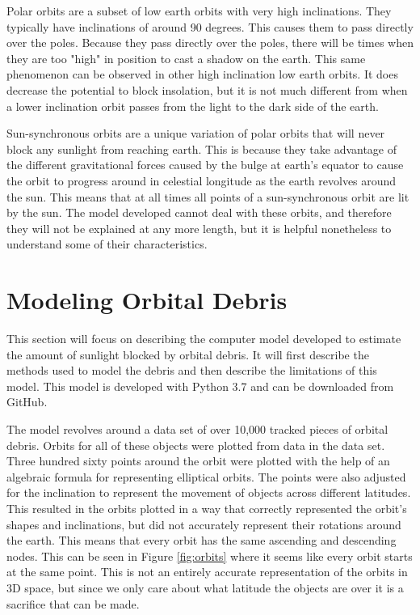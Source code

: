 \documentclass[11pt]{article}
\begin{document}
\begin{multicols*}{2}
Polar orbits are a subset of low earth orbits with very high inclinations. They typically have inclinations of around 90 degrees. This causes them to pass directly over the poles. Because they pass directly over the poles, there will be times when they are too "high" in position to cast a shadow on the earth. This same phenomenon can be observed in other high inclination low earth orbits. It does decrease the potential to block insolation, but it is not much different from when a lower inclination orbit passes from the light to the dark side of the earth. 

Sun-synchronous orbits are a unique variation of polar orbits that will never block any sunlight from reaching earth. This is because they take advantage of the different gravitational forces caused by the bulge at earth's equator to cause the orbit to progress around in celestial longitude as the earth revolves around the sun. This means that at all times all points of a sun-synchronous orbit are lit by the sun. The model developed cannot deal with these orbits, and therefore they will not be explained at any more length, but it is helpful nonetheless to understand some of their characteristics.
\section{Modeling Orbital Debris} \label{methods}
This section will focus on describing the computer model developed to estimate the amount of sunlight blocked by orbital debris. It will first describe the methods used to model the debris and then describe the limitations of this model. This model is developed with Python 3.7 and can be downloaded from GitHub. \cite{github}

The model revolves around a data set of over 10,000 tracked pieces of orbital debris. Orbits for all of these objects were plotted from data in the data set. Three hundred sixty points around the orbit were plotted with the help of an algebraic formula for representing elliptical orbits. The points were also adjusted for the inclination to represent the movement of objects across different latitudes. This resulted in the orbits plotted in a way that correctly represented the orbit's shapes and inclinations, but did not accurately represent their rotations around the earth. This means that every orbit has the same ascending and descending nodes. This can be seen in Figure \ref{fig:orbits} where it seems like every orbit starts at the same point. This is not an entirely accurate representation of the orbits in 3D space, but since we only care about what latitude the objects are over it is a sacrifice that can be made.


\end{multicols*}
\end{document}

